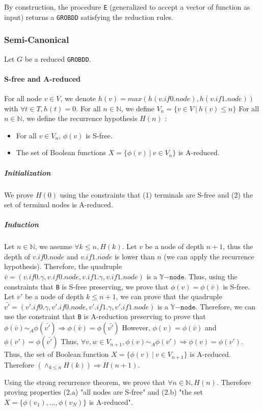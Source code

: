 \documentclass[a4paper,10pt]{article}
\newcommand{\N}{\mathbb{N}}%
\newcommand{\Y}{\mathbb{Y}}
\newcommand{\Ynode}{\Y\mathtt{-node}}
\newcommand{\GroBdd}{\texttt{GROBDD}}
\begin{document}
By construction, the procedure \texttt{E} (generalized to accept a vector of function as input) returns a \GroBdd{} satisfying the reduction rules.

\subsubsection{Semi-Canonical}

Let $G$ be a reduced \GroBdd{}.

\paragraph{S-free and A-reduced}
For all node $v\in V$, we denote $h(v) = max(h(v.if0.node), h(v.if1.node))$ with $\forall t\in T, h(t) = 0$.
For all $n\in\N$, we define $V_n = \{v\in V ~|~ h(v) \leq n\}$
For all $n\in\N$, we define the recurrence hypothesis $H(n)$ :\begin{itemize}
\item For all $v\in V_n$, $\phi(v)$ is S-free.
\item The set of Boolean functions $X = \{\phi(v) ~|~ v\in V_n\}$ is A-reduced.
\end{itemize}

\subparagraph{Initialization}
We prove $H(0)$ using the constraints that (1) terminals are S-free and (2) the set of terminal nodes is A-reduced.

\subparagraph{Induction}
Let $n\in\N$, we assume $\forall k\leq n, H(k)$.
Let $v$ be a node of depth $n+1$, thus the depth of $v.if0.node$ and $v.if1.node$ is lower than $n$ (we can apply the recurrence hypothesis).
Therefore, the quadruple $\bar{v} = (v.if0.\gamma, v.if0.node, v.if1.\gamma, v.if1.node)$ is a $\Ynode$.
Thus, using the constraints that \texttt{B} is S-free preserving, we prove that $\phi(v) = \phi(\bar{v})$ is S-free.
Let $v'$ be a node of depth $k\leq n+1$, we can prove that the quadruple $\bar{v'} = (v'.if0.\gamma, v'.if0.node, v'.if1.\gamma, v'.if1.node)$ is a $\Ynode$.
Therefore, we can use the constraint that \texttt{B} is A-reduction preserving to prove that $\phi(\bar{v}) \sim_A \phi(\bar{v'}) \Rightarrow \phi(\bar{v}) = \phi(\bar{v'})$
However, $\phi(v) = \phi(\bar{v})$ and $\phi(v') = \phi(\bar{v'})$
Thus, $\forall v, w \in V_{n+1}, \phi(v) \sim_A \phi(v') \Rightarrow \phi(v) = \phi(v')$.
Thus, the set of Boolean function $X = \{\phi(v) ~|~ v\in V_{n+1}\}$ is A-reduced.
Therefore $\left(\land_{k\leq n} H(k)\right) \Rightarrow H(n+1)$.

Using the strong recurrence theorem, we prove that $\forall n\in\N, H(n)$.
Therefore proving properties (2.a) "all nodes are S-free" and (2.b) "the set $X = \{\phi(v_1), \dots, \phi(v_N)\}$ is A-reduced".
\end{document}
